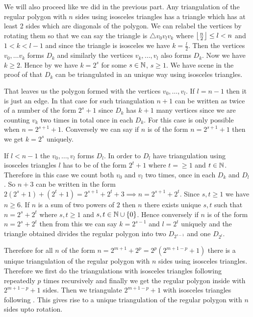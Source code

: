 \documentclass[a4paper, 11pt]{article}
\begin{document}
{\begin{itemize}[label=$\bullet$]
\begin{itemize}
We will also proceed like we did in the previous part. Any triangulation of the regular polygon with $n$ sides using isosceles triangles has a triangle which has at least 2 sides which are diagonals of the polygon. We can relabel the vertices by rotating them so that we can say the triangle is $\triangle v_0v_lv_k$ where $\left\lfloor\frac{n}2\right\rfloor\leq l<n$ and $1<k<l-1$ and since the triangle is isosceles we have $k=\frac{l}2$. Then the vertices $v_0,\dots  v_k$ forms $D_{k}$ and similarly the vertices  $v_k,\dots, v_l$ also forms $D_k$. Now we have $k\geq 2$. Hence by  we have $k=2^s$ for some $s\in\mathbb{N}$, $s\geq 1$. We have scene in the proof of  that $D_k$ can be triangulated in an unique way using isosceles triangles.  

That leaves us the polygon formed with the vertices $v_0,\dots, v_l$. If $l=n-1$ then it is just an edge. In that case for such triangulation $n+1$ can be written as twice of a number of the form $2^s+1$ since $D_k$ has $k+1$ many vertices since we are counting $v_k$ two times in total once in each $D_k$. For this case is only possible when $n=2^{s+1}+1$. Conversely we can say if $n$ is of the form $n=2^{s+1}+1$ then we get $k=2^s$ uniquely. 

If $l<n-1$ the $v_0,\dots, v_l$ forms $D_l$. In order to $D_l$ have triangulation using isosceles triangles $l$ has to be of the form $2^t+1$ where $t=\geq 1$ and $t\in\mathbb{N}$. Therefore in this case we count both $v_0$ and $v_l$ two times, once in each $D_k$ and $D_l$. So $n+3$ can be written in the form $2(2^s+1)+(2^t+1)=2^{s+1}+2^t +3\implies n=2^{s+1}+2^t$. Since $s,t\geq 1$ we have $n\geq 6$.  If $n$ is a sum of two powers of $2$ then $n$ there exists unique $s,t$ such that $n=2^s+2^t$ where $s,t\geq 1$ and $s,t\in\mathbb{N}\cup\{0\}$. Hence conversely if $n$ is of the form $n=2^s+2^t$ then from this we can say $k=2^{s-1}$ and $l=2^t$ uniquely and the triangle obtained divides the regular polygon into two $D_{2^{s-1}}$ and one $D_{2^t}$. 

Therefore for all $n$ of the form $n=2^{m+1}+2^p=2^p(2^{m+1-p}+1)$ there is a unique triangulation of the regular polygon with $n$ sides using isosceles triangles. Therefore we first do the triangulations with isosceles triangles following  repeatedly $p$ times recursively and finally we get the regular polygon inside with  $2^{m+1-p}+1$ sides. Then we triangulate $2^{m+1-p}+1$ with isosceles triangles following . This gives rise to a unique triangulation of the regular polygon with $n$ sides upto rotation. 


\end{itemize}
\end{itemize}}
\end{document}
